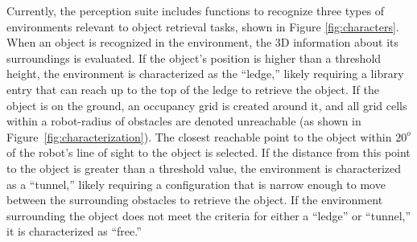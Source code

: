 \documentclass[conference]{IEEEtran}
\begin{document}

Currently, the perception suite includes functions to recognize three types of environments relevant to object retrieval tasks, shown in Figure \ref{fig:characters}.  When an object is recognized in the environment, the 3D information about its surroundings is evaluated. If the object's position is higher than a threshold height, the environment is characterized as the ``ledge,'' likely requiring a library entry that can reach up to the top of the ledge to retrieve the object.
If the object is on the ground, an occupancy grid is created around it, and all grid cells within a robot-radius of obstacles are denoted unreachable (as shown in Figure~\ref{fig:characterization}). The closest reachable point to the object within $20^o$ of the robot's line of sight to the object is selected. If the distance from this point to the object is greater than a threshold value, the environment is characterized as a ``tunnel,'' likely requiring a configuration that is narrow enough to move between the surrounding obstacles to retrieve the object.
If the environment surrounding the object does not meet the criteria for either a ``ledge'' or ``tunnel,'' it is characterized as ``free.''
%
\end{document}
